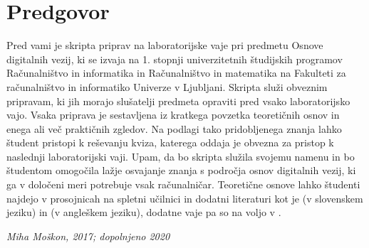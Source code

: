 \chapter*{Predgovor}

Pred vami je skripta priprav na laboratorijske vaje pri predmetu Osnove digitalnih vezij, ki se izvaja na 1. stopnji univerzitetnih študijskih programov Računalništvo in informatika in Računalništvo in matematika na Fakulteti za računalništvo in informatiko Univerze v Ljubljani. Skripta služi obveznim pripravam, ki jih morajo slušatelji predmeta opraviti pred vsako laboratorijsko vajo. Vsaka priprava je sestavljena iz kratkega povzetka teoretičnih osnov in enega ali več praktičnih zgledov. Na podlagi tako pridobljenega znanja lahko študent pristopi k reševanju kviza, katerega oddaja je obvezna za pristop k naslednji laboratorijski vaji. Upam, da bo skripta služila svojemu namenu in bo študentom omogočila lažje osvajanje znanja s področja osnov digitalnih vezij, ki ga v določeni meri potrebuje vsak računalničar. Teoretične osnove lahko študenti najdejo v prosojnicah na spletni učilnici in dodatni literaturi kot je \cite{virant:1996} (v slovenskem jeziku) in \cite{tocci:2010} (v angleškem jeziku), dodatne vaje pa so na voljo v \cite{bajec:2002,trebar:1992}.

\begin{flushright}
\textit{Miha Moškon, 2017; dopolnjeno 2020}
\end{flushright}
